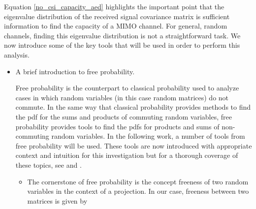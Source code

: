 Equation \eqref{no_csi_capacity_aed} highlights the important point that the eigenvalue distribution of the received signal covariance matrix is sufficient information to find the capacity of a MIMO channel. For general, random channels, finding this eigenvalue distribution is not a straightforward task.
We now introduce some of the key tools that will be used in order to perform this analysis.
\begin{itemize}
\item 
	A brief introduction to free probability.
	\par 
	Free probability is the counterpart to classical probability used to analyze cases in which random variables (in this case random matrices) do 
	not commute. In the same way that classical probability provides methods to find the pdf for the sums and products of commuting random
	 variables, free probability provides tools to find the pdfs for products and sums of non-commuting random variables.
	In the following work, a number of tools from free probability will be used. These tools are now introduced with appropriate context and intuition 
	for this investigation but for a thorough coverage of these topics, see \cite{tulino2004random} and \cite{mingo2017free}.
	 \begin{itemize}
	 \item 
	 	The cornerstone of free probability is the concept freeness of two random variables in the context of a projection. In our case, freeness between two 
	 	matrices is given by 


\end{itemize}
\end{itemize}
